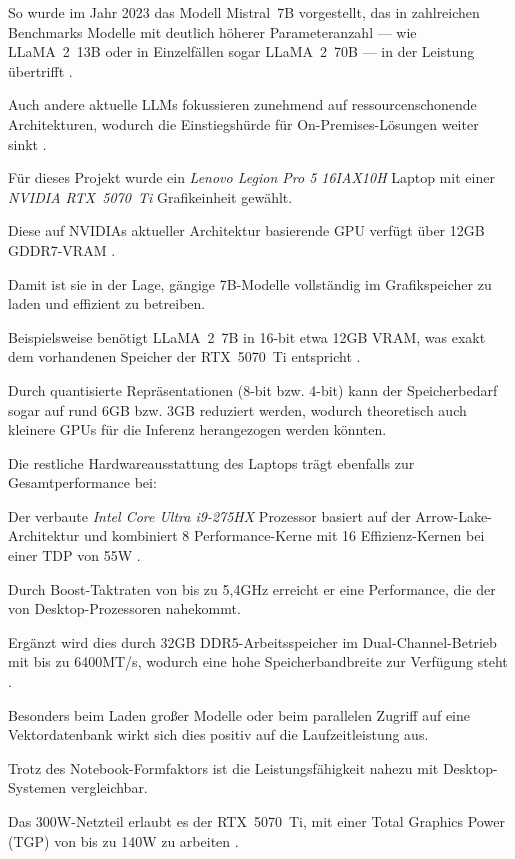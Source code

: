So wurde im Jahr 2023 das Modell Mistral~7B vorgestellt, das in zahlreichen Benchmarks Modelle mit deutlich höherer Parameteranzahl — wie LLaMA~2~13B oder in Einzelfällen sogar LLaMA~2~70B — in der Leistung übertrifft \cite{obotaiblog}.

Auch andere aktuelle LLMs fokussieren zunehmend auf ressourcenschonende Architekturen, wodurch die Einstiegshürde für On-Premises-Lösungen weiter sinkt \cite{edge_medium}.

Für dieses Projekt wurde ein \textit{Lenovo Legion Pro 5 16IAX10H} Laptop mit einer \textit{NVIDIA RTX~5070~Ti} Grafikeinheit gewählt.

Diese auf NVIDIAs aktueller Architektur basierende GPU verfügt über 12GB GDDR7-VRAM \cite{notebookcheck_legion}.

Damit ist sie in der Lage, gängige 7B-Modelle vollständig im Grafikspeicher zu laden und effizient zu betreiben.

Beispielsweise benötigt LLaMA~2~7B in 16-bit etwa 12GB VRAM, was exakt dem vorhandenen Speicher der RTX~5070~Ti entspricht \cite{bacloud_gpu_guide}.

Durch quantisierte Repräsentationen (8-bit bzw. 4-bit) kann der Speicherbedarf sogar auf rund 6GB bzw. 3GB reduziert werden, wodurch theoretisch auch kleinere GPUs für die Inferenz herangezogen werden könnten.

Die restliche Hardwareausstattung des Laptops trägt ebenfalls zur Gesamtperformance bei:

Der verbaute \textit{Intel Core Ultra i9-275HX} Prozessor basiert auf der Arrow-Lake-Architektur und kombiniert 8 Performance-Kerne mit 16 Effizienz-Kernen bei einer TDP von 55W \cite{notebookcheck_legion}.

Durch Boost-Taktraten von bis zu 5,4GHz erreicht er eine Performance, die der von Desktop-Prozessoren nahekommt.

Ergänzt wird dies durch 32GB DDR5-Arbeitsspeicher im Dual-Channel-Betrieb mit bis zu 6400MT/s, wodurch eine hohe Speicherbandbreite zur Verfügung steht \cite{microcenter_legion}.

Besonders beim Laden großer Modelle oder beim parallelen Zugriff auf eine Vektordatenbank wirkt sich dies positiv auf die Laufzeitleistung aus.

Trotz des Notebook-Formfaktors ist die Leistungsfähigkeit nahezu mit Desktop-Systemen vergleichbar.

Das 300W-Netzteil erlaubt es der RTX~5070~Ti, mit einer Total Graphics Power (TGP) von bis zu 140W zu arbeiten \cite{notebookcheck_legion}.

